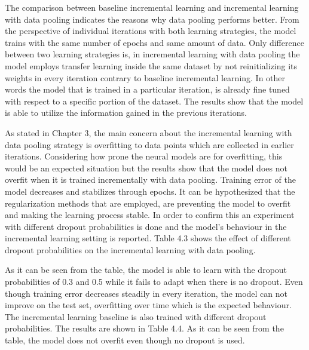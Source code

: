 The comparison between baseline incremental learning and incremental learning with data pooling indicates the reasons why data pooling performs better. From the perspective of individual iterations with both learning strategies, the model trains with the same number of epochs and same amount of data. Only difference between two learning strategies is, in incremental learning with data pooling the model employs transfer learning inside the same dataset by not reinitializing its weights in every iteration contrary to baseline incremental learning. In other words the model that is trained in a particular iteration, is already fine tuned with respect to a specific portion of the dataset. The results show that the model is able to utilize the information gained in the previous iterations.

As stated in Chapter 3, the main concern about the incremental learning with data pooling strategy is overfitting to data points which are collected in earlier iterations. Considering how prone the neural models are for overfitting, this would be an expected situation but the results show that the model does not overfit when it is trained incrementally with data pooling. Training error of the model decreases and stabilizes through epochs. It can be hypothesized that the regularization methods that are employed, are preventing the model to overfit and making the learning process stable. In order to confirm this an experiment with different dropout probabilities is done and the model's behaviour in the incremental learning setting is reported. Table 4.3 shows the effect of different dropout probabilities on the incremental learning with data pooling.

As it can be seen from the table, the model is able to learn with the dropout probabilities of 0.3 and 0.5 while it fails to adapt when there is no dropout. Even though training error decreases steadily in every iteration, the model can not improve on the test set, overfitting over time which is the expected behaviour. The incremental learning baseline is also trained with different dropout probabilities. The results are shown in Table 4.4. As it can be seen from the table, the model does not overfit even though no dropout is used.


